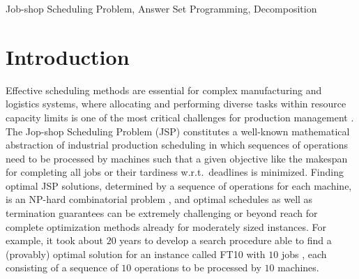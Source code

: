 \documentclass{tlp} %
\begin{document}
\begin{abstract}
\end{abstract}
%
\begin{keywords}
Job-shop Scheduling Problem, Answer Set Programming, Decomposition
\end{keywords}
%
%
\section{Introduction}
Effective scheduling methods are essential for complex manufacturing and logistics systems,
where allocating and performing diverse tasks within resource capacity limits 
is one of the most critical challenges for production management \citep{uzsoy2000performance}.
The Jop-shop Scheduling Problem (JSP) \citep{baker1974introduction,taillard1993benchmarks}
constitutes a well-known mathematical abstraction of industrial production scheduling in
which sequences of operations need to be processed by machines such that a given objective
like the makespan for completing all jobs or their tardiness w.r.t.\ deadlines is minimized.
Finding optimal JSP solutions, determined by a sequence of operations for each machine,
is an NP-hard combinatorial problem
\citep{garey1976complexity,lenstra1977complexity,liu2008prediction},
and optimal schedules as well as termination guarantees can be extremely challenging
or beyond reach 
for complete optimization methods already for moderately sized instances.
For example, it took about $20$ years to develop a search procedure able to find a
(provably) optimal solution for an instance called FT10 with $10$ jobs
\citep{adams1988shifting,zhang2010hybrid},
each consisting of a sequence of $10$ operations to be processed by $10$ machines.
\end{document}
